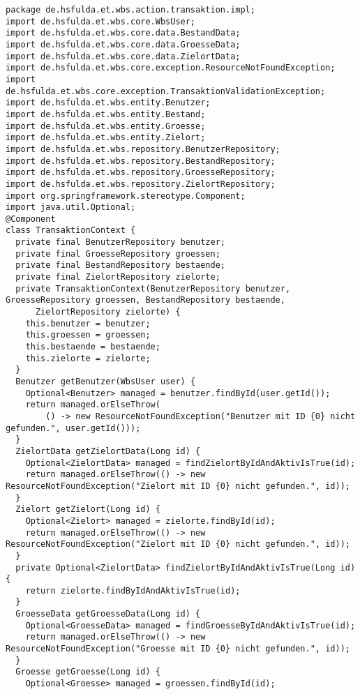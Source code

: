 \begin{lstlisting}[caption={Kontext und Abstraktion der Daten für die Erfassung von Transaktionen.}, label={lst:TransaktionContext}]
package de.hsfulda.et.wbs.action.transaktion.impl;
import de.hsfulda.et.wbs.core.WbsUser;
import de.hsfulda.et.wbs.core.data.BestandData;
import de.hsfulda.et.wbs.core.data.GroesseData;
import de.hsfulda.et.wbs.core.data.ZielortData;
import de.hsfulda.et.wbs.core.exception.ResourceNotFoundException;
import de.hsfulda.et.wbs.core.exception.TransaktionValidationException;
import de.hsfulda.et.wbs.entity.Benutzer;
import de.hsfulda.et.wbs.entity.Bestand;
import de.hsfulda.et.wbs.entity.Groesse;
import de.hsfulda.et.wbs.entity.Zielort;
import de.hsfulda.et.wbs.repository.BenutzerRepository;
import de.hsfulda.et.wbs.repository.BestandRepository;
import de.hsfulda.et.wbs.repository.GroesseRepository;
import de.hsfulda.et.wbs.repository.ZielortRepository;
import org.springframework.stereotype.Component;
import java.util.Optional;
@Component
class TransaktionContext {
  private final BenutzerRepository benutzer;
  private final GroesseRepository groessen;
  private final BestandRepository bestaende;
  private final ZielortRepository zielorte;
  private TransaktionContext(BenutzerRepository benutzer, GroesseRepository groessen, BestandRepository bestaende,
      ZielortRepository zielorte) {
    this.benutzer = benutzer;
    this.groessen = groessen;
    this.bestaende = bestaende;
    this.zielorte = zielorte;
  }
  Benutzer getBenutzer(WbsUser user) {
    Optional<Benutzer> managed = benutzer.findById(user.getId());
    return managed.orElseThrow(
        () -> new ResourceNotFoundException("Benutzer mit ID {0} nicht gefunden.", user.getId()));
  }
  ZielortData getZielortData(Long id) {
    Optional<ZielortData> managed = findZielortByIdAndAktivIsTrue(id);
    return managed.orElseThrow(() -> new ResourceNotFoundException("Zielort mit ID {0} nicht gefunden.", id));
  }
  Zielort getZielort(Long id) {
    Optional<Zielort> managed = zielorte.findById(id);
    return managed.orElseThrow(() -> new ResourceNotFoundException("Zielort mit ID {0} nicht gefunden.", id));
  }
  private Optional<ZielortData> findZielortByIdAndAktivIsTrue(Long id) {
    return zielorte.findByIdAndAktivIsTrue(id);
  }
  GroesseData getGroesseData(Long id) {
    Optional<GroesseData> managed = findGroesseByIdAndAktivIsTrue(id);
    return managed.orElseThrow(() -> new ResourceNotFoundException("Groesse mit ID {0} nicht gefunden.", id));
  }
  Groesse getGroesse(Long id) {
    Optional<Groesse> managed = groessen.findById(id);

\end{lstlisting}
